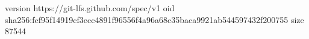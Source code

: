 version https://git-lfs.github.com/spec/v1
oid sha256:fcf95f14919cf3ecc4891f96556f4a96a68c35baca9921ab544597432f200755
size 87544
